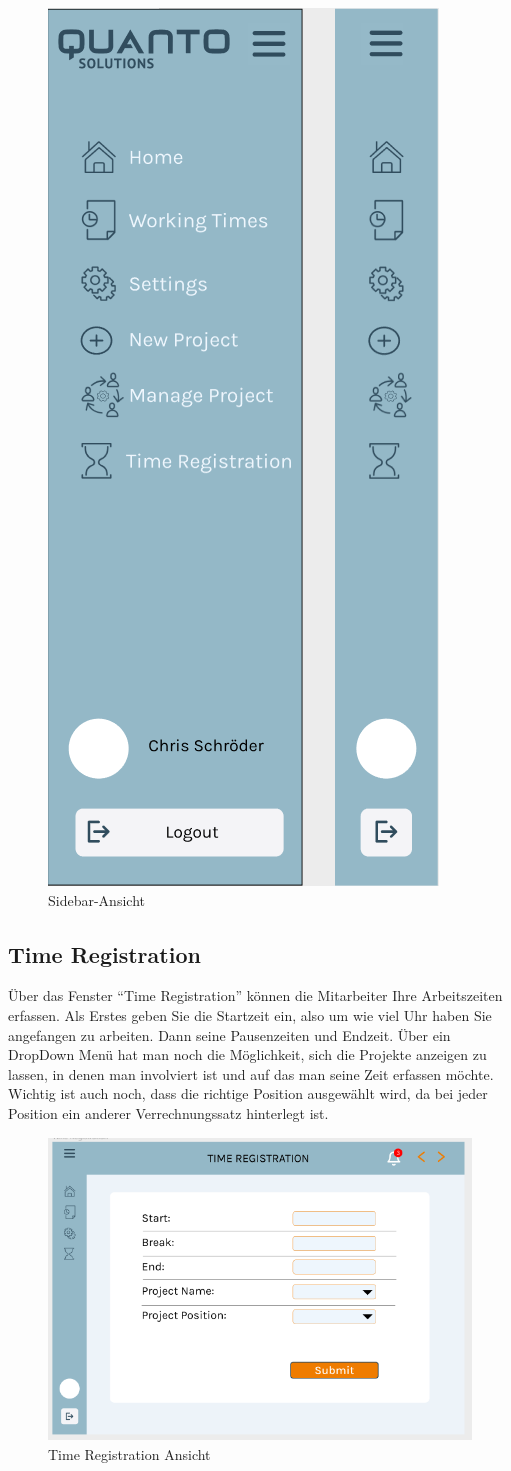\documentclass{article}
\begin{document}
\begin{figure}[h]
    \includegraphics[height= 0.5\textwidth,width= \textwidth]{images/Sidebar.png}
    \caption{Sidebar-Ansicht}
    \label{fig:beispiel}
\end{figure}

\newpage
\subsection{Time Registration}
Über das Fenster “Time Registration” können die Mitarbeiter Ihre Arbeitszeiten erfassen.  Als Erstes geben Sie die Startzeit ein, also um wie viel Uhr haben Sie angefangen zu arbeiten. Dann seine Pausenzeiten und Endzeit. Über ein DropDown Menü hat man noch die Möglichkeit, sich die Projekte anzeigen zu lassen, in denen man involviert ist und auf das man seine Zeit erfassen möchte. Wichtig ist auch noch, dass die richtige Position ausgewählt wird, da bei jeder Position ein anderer Verrechnungssatz hinterlegt ist.
\begin{figure}[h]
    \includegraphics[height= 0.5\textwidth,width= \textwidth]{images/Time Registration.png}
    \caption{Time Registration Ansicht}
    \label{fig:beispiel}
\end{figure}
\end{document}
